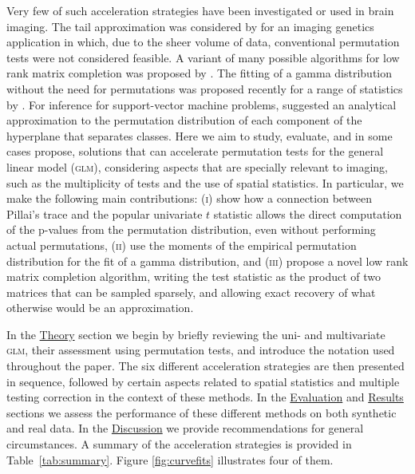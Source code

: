 Very few of such acceleration strategies have been investigated or used in brain imaging. The tail approximation was considered by \citet{Ge2012} for an imaging genetics application in which, due to the sheer volume of data, conventional permutation tests were not considered feasible. A variant of many possible algorithms for low rank matrix completion was proposed by \citet{Hinrichs2013}. The fitting of a gamma distribution without the need for permutations was proposed recently for a range of statistics by \citet{Minas2014}. For inference for support-vector machine problems, \citet{Gaonkar2012} suggested an analytical approximation to the permutation distribution of each component of the hyperplane that separates classes. Here we aim to study, evaluate, and in some cases propose, solutions that can accelerate permutation tests for the general linear model (\textsc{glm}), considering aspects that are specially relevant to imaging, such as the multiplicity of tests and the use of spatial statistics. In particular, we make the following main contributions: (\textsc{i}) show how a connection between Pillai's trace and the popular univariate $t$ statistic allows the direct computation of the p-values from the permutation distribution, even without performing actual permutations, (\textsc{ii}) use the moments of the empirical permutation distribution for the fit of a gamma distribution, and (\textsc{iii}) propose a novel low rank matrix completion algorithm, writing the test statistic as the product of two matrices that can be sampled sparsely, and allowing exact recovery of what otherwise would be an approximation.

In the \href{sec:accel:theory}{Theory} section we begin by briefly reviewing the uni- and multivariate \textsc{glm}, their assessment using permutation tests, and introduce the notation used throughout the paper. The six different acceleration strategies are then presented in sequence, followed by certain aspects related to spatial statistics and multiple testing correction in the context of these methods. In the \href{sec:accel:evaluation}{Evaluation} and \href{sec:accel:results}{Results} sections we assess the performance of these different methods on both synthetic and real data. In the \href{sec:accel:discussion}{Discussion} we provide recommendations for general circumstances. A summary of the acceleration strategies is provided in Table~\ref{tab:summary}. Figure \ref{fig:curvefits} illustrates four of them.

